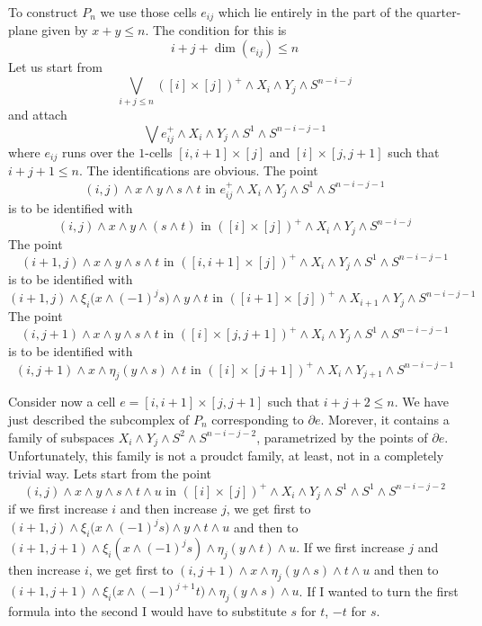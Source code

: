 \documentclass[../main]{subfiles}
\begin{document}
To construct $P_n$ we use those cells $e_{ij}$ which lie entirely in the part of the quarter-plane given by $x+y\leq n$. The condition for this is
\[i+j+\dim(e_{ij})\leq n\]
Let us start from
\[\bigvee_{i+j\leq n}([i]\times [j])^+ \wedge X_i \wedge Y_j \wedge S^{n-i-j}\]
and attach
\[\bigvee e_{ij}^+ \wedge X_i\wedge Y_j\wedge S^1 \wedge S^{n-i-j-1}\]
where $e_{ij}$ runs over the $1$-cells $[i,i+1]\times [j]$ and $[i]\times [j,j+1]$ such that $i+j+1\leq n$. The identifications are obvious. The point
\[(i,j)\wedge x\wedge y\wedge s\wedge t \text{  in  }e_{ij}^+\wedge X_i \wedge Y_j \wedge S^1 \wedge S^{n-i-j-1} \]
is to be identified with
\[(i,j)\wedge x\wedge y\wedge (s\wedge t) \text{  in  }([i]\times [j])^+\wedge X_i \wedge Y_j \wedge S^{n-i-j} \]
The point
\[(i+1,j)\wedge x\wedge y\wedge s\wedge t \text{  in  }([i,i+1]\times [j])^+\wedge X_{i} \wedge Y_j\wedge S^1 \wedge S^{n-i-j-1} \]
is to be identified with
\[(i+1,j)\wedge \xi_i\big( x\wedge (-1)^j s\big)\wedge y\wedge t \text{  in  }([i+1]\times [j])^+\wedge X_{i+1} \wedge Y_j \wedge S^{n-i-j-1} \]
The point
\[(i,j+1)\wedge x\wedge y\wedge s\wedge t \text{  in  }([i]\times [j,j+1])^+\wedge X_{i} \wedge Y_j\wedge S^1 \wedge S^{n-i-j-1} \]
is to be identified with
\[(i,j+1)\wedge x\wedge \eta_j(y\wedge s)\wedge t \text{  in  }([i]\times [j+1])^+\wedge X_{i} \wedge Y_{j+1} \wedge S^{n-i-j-1} \]

Consider now a cell $e=[i,i+1]\times [j,j+1]$ such that $i+j+2\leq n$. We have just described the subcomplex of $P_n$ corresponding to $\partial e$. Morever, it contains a family of subspaces $X_i\wedge Y_j \wedge S^2 \wedge S^{n-i-j-2}$, parametrized by the points of $\partial e$. Unfortunately, this family is not a proudct family, at least, not in a completely trivial way. Lets start from the point
\[(i,j)\wedge x\wedge y\wedge s\wedge t\wedge u \text{  in  }([i]\times[j])^+\wedge X_i \wedge Y_j \wedge S^1 \wedge S^1\wedge S^{n-i-j-2} \]
if we first increase $i$ and then increase $j$, we get first to \newline $(i+1,j)\wedge \xi_i\big(x\wedge (-1)^j s\big) \wedge y\wedge t\wedge u $ and then to $(i+1,j+1)\wedge \xi_i(x\wedge (-1)^j s) \wedge \eta_j(y\wedge t)\wedge u $. If we first increase $j$ and then increase $i$, we get first to $(i,j+1)\wedge x\wedge   \eta_j(y\wedge s)\wedge t\wedge u $ and then to $(i+1,j+1)\wedge \xi_i\big(x\wedge (-1)^{j+1} t\big) \wedge \eta_j(y\wedge s)\wedge u $. If I wanted to turn the first formula into the second I would have to substitute $s$ for $t$, $-t$ for $s$.
\end{document}
